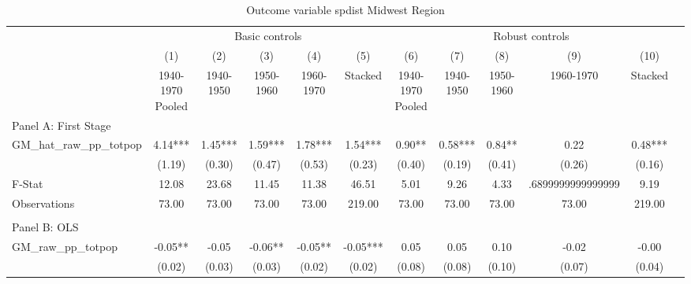  \begin{table}[htbp]\centering {} \begin{threeparttable} \caption{Outcome variable spdist Midwest Region} \begin{tabular}{l*{11}{c}} \toprule
          &\multicolumn{5}{c}{Basic controls}                                   &\multicolumn{5}{c}{Robust controls}                                  \\\cmidrule(lr){2-6}\cmidrule(lr){7-11}
          &\multicolumn{1}{c}{(1)}&\multicolumn{1}{c}{(2)}&\multicolumn{1}{c}{(3)}&\multicolumn{1}{c}{(4)}&\multicolumn{1}{c}{(5)}&\multicolumn{1}{c}{(6)}&\multicolumn{1}{c}{(7)}&\multicolumn{1}{c}{(8)}&\multicolumn{1}{c}{(9)}&\multicolumn{1}{c}{(10)}\\
          &\multicolumn{1}{c}{1940-1970 Pooled}&\multicolumn{1}{c}{1940-1950}&\multicolumn{1}{c}{1950-1960}&\multicolumn{1}{c}{1960-1970}&\multicolumn{1}{c}{Stacked}&\multicolumn{1}{c}{1940-1970 Pooled}&\multicolumn{1}{c}{1940-1950}&\multicolumn{1}{c}{1950-1960}&\multicolumn{1}{c}{1960-1970}&\multicolumn{1}{c}{Stacked}\\
\cmidrule(lr){1-11}
\multicolumn{10}{l}{Panel A: First Stage}\\
\cmidrule(lr){1-11}
GM\_hat\_raw\_pp\_totpop&      4.14***&      1.45***&      1.59***&      1.78***&      1.54***&      0.90** &      0.58***&      0.84** &      0.22   &      0.48***\\
          &    (1.19)   &    (0.30)   &    (0.47)   &    (0.53)   &    (0.23)   &    (0.40)   &    (0.19)   &    (0.41)   &    (0.26)   &    (0.16)   \\
\midrule
F-Stat    &     12.08   &     23.68   &     11.45   &     11.38   &     46.51   &      5.01   &      9.26   &      4.33   &.6899999999999999   &      9.19   \\
Observations&     73.00   &     73.00   &     73.00   &     73.00   &    219.00   &     73.00   &     73.00   &     73.00   &     73.00   &    219.00   \\
\cmidrule[\heavyrulewidth](lr){1-11} \\ \cmidrule[\heavyrulewidth](lr){1-11}
\multicolumn{10}{l}{Panel B: OLS}\\
\cmidrule(lr){1-11}
GM\_raw\_pp\_totpop&     -0.05** &     -0.05   &     -0.06** &     -0.05** &     -0.05***&      0.05   &      0.05   &      0.10   &     -0.02   &     -0.00   \\
          &    (0.02)   &    (0.03)   &    (0.03)   &    (0.02)   &    (0.02)   &    (0.08)   &    (0.08)   &    (0.10)   &    (0.07)   &    (0.04)   \\

\end{tabular}
\end{threeparttable}
\end{table}
